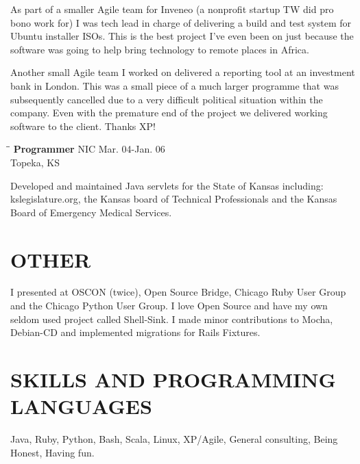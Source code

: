 \documentclass{res}
\begin{document}
\begin{resume}
    As part of a smaller Agile team for Inveneo (a nonprofit startup TW
    did pro bono work for) I was tech lead in charge of delivering 
    a build and test system for Ubuntu installer ISOs. This is the
    best project I've even been on just because the software was
    going to help bring technology to remote places in Africa.

    Another small Agile team I worked on delivered a reporting tool
    at an investment bank in London.  This was a small piece of a 
    much larger programme that was subsequently cancelled due to 
    a very difficult political situation within the company.  Even
    with the premature end of the project we delivered working software
    to the client.  Thanks XP! %

   \begin{tabbing}
   \hspace{2.3in}\= \hspace{2.6in}\= \kill %
    {\bf Programmer} \>NIC \> Mar. 04-Jan. 06\\
                          \>Topeka, KS
   \end{tabbing}\vspace{-20pt}
    Developed and maintained Java servlets for the State of Kansas
    including: kslegislature.org, the Kansas board of Technical 
    Professionals and the Kansas Board of Emergency Medical Services.

\section{OTHER}          
    I presented at OSCON (twice), Open Source Bridge, Chicago Ruby 
    User Group and the Chicago Python User Group.  I love Open 
    Source and have my own seldom used project called Shell-Sink.  
    I made minor contributions to Mocha, Debian-CD and implemented 
    migrations for Rails Fixtures.

\section{SKILLS AND PROGRAMMING LANGUAGES}          
    Java, Ruby, Python, Bash, Scala, Linux, XP/Agile, General 
    consulting, Being Honest, Having fun.
     

\end{resume}
\end{document}
